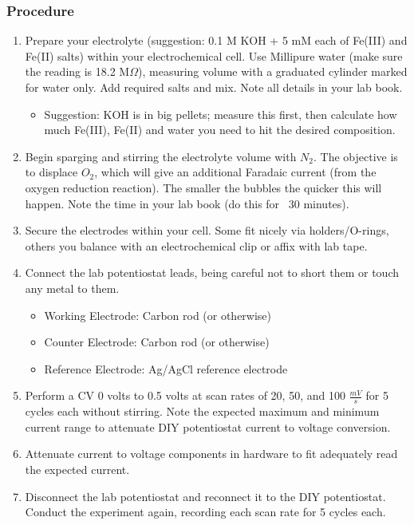 \documentclass{article}
\begin{document}
\subsubsection*{Procedure}
\begin{enumerate}
\item Prepare your electrolyte (suggestion: 0.1 M KOH + 5 mM each of Fe(III) and Fe(II) salts) within your electrochemical cell. Use Millipure water (make sure the reading is 18.2 M$\Omega$), measuring volume with a graduated cylinder marked for water only. Add required salts and mix. Note all details in your lab book.
\begin{itemize}
\item Suggestion: KOH is in big pellets; measure this first, then calculate how much Fe(III), Fe(II) and water you need to hit the desired composition.
\end{itemize}
\item Begin sparging and stirring the electrolyte volume with $N_2$. The objective is to displace $O_2$, which will give an additional Faradaic current (from the oxygen reduction reaction). The smaller the bubbles the quicker this will happen. Note the time in your lab book (do this for ~30 minutes).
\item Secure the electrodes within your cell. Some fit nicely via holders/O-rings, others you balance with an electrochemical clip or affix with lab tape.
\item Connect the lab potentiostat leads, being careful not to short them or touch any metal to them.
\begin{itemize}
\item Working Electrode: Carbon rod (or otherwise)
\item Counter Electrode: Carbon rod (or otherwise)
\item Reference Electrode: Ag/AgCl reference electrode
\end{itemize}
\item Perform a CV 0 volts to 0.5 volts at scan rates of 20, 50, and 100 $\frac{mV}{s}$ for 5 cycles each without stirring. Note the expected maximum and minimum current range to attenuate DIY potentiostat current to voltage conversion.
\item Attenuate current to voltage components in hardware to fit adequately read the expected current.
\item Disconnect the lab potentiostat and reconnect it to the DIY potentiostat. Conduct the experiment again, recording each scan rate for 5 cycles each.
\end{enumerate}
\end{document}
